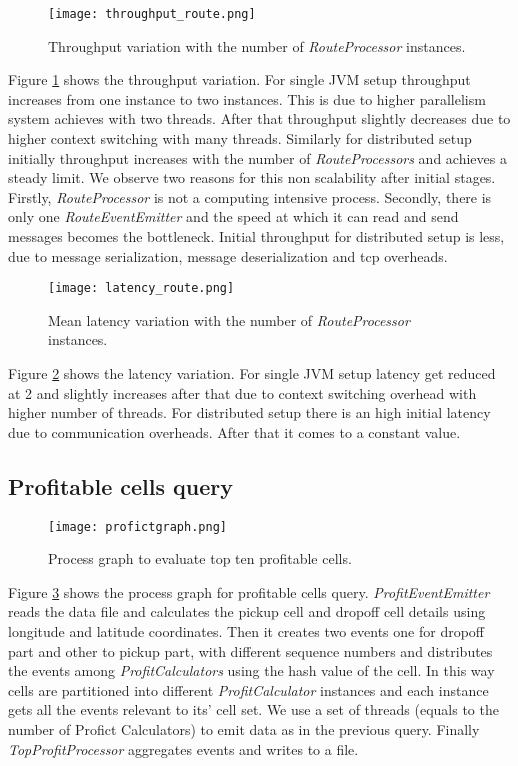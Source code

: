 \begin{figure}[!t]
        \centering
        \texttt{[image: throughput\_route.png]}
        \caption{Throughput variation with the number of \textit{RouteProcessor} instances.}
        \label{throughput_route}
\end{figure}

Figure \ref{throughput_route} shows the throughput variation. For single JVM setup throughput increases from one instance to two instances. This is due to higher parallelism system achieves with two threads. After that throughput slightly decreases due to higher context switching with many threads. Similarly for distributed setup initially throughput increases with the number of   \textit{RouteProcessors} and achieves a steady limit. We observe two reasons for this non scalability after initial stages. Firstly, \textit{RouteProcessor} is not a computing intensive process. Secondly, there is only one \textit{RouteEventEmitter} and the speed at which it can read and send messages becomes the bottleneck. Initial throughput for distributed setup is less, due to message serialization, message deserialization and tcp overheads. 

\begin{figure}[!t]
        \centering
        \texttt{[image: latency\_route.png]}
        \caption{Mean latency variation with the number of \textit{RouteProcessor} instances.}
        \label{latency_route}
\end{figure}

Figure \ref{latency_route} shows the latency variation. For single JVM setup latency get reduced at 2 and slightly increases after that due to context switching overhead with higher number of threads. For distributed setup there is an high initial latency due to communication overheads. After that it comes to a constant value. 

\subsection{Profitable cells query}

\begin{figure}[!t]
        \centering
        \texttt{[image: profictgraph.png]}
        \caption{Process graph to evaluate top ten profitable cells.}
        \label{profictgraph}
\end{figure}

Figure \ref{profictgraph} shows the process graph for profitable cells query. \textit{ProfitEventEmitter} reads the data file and calculates the pickup cell and dropoff cell details using longitude and latitude coordinates. Then it creates two events one for dropoff part and other to pickup part, with different sequence numbers and distributes the events among \textit{ProfitCalculators} using the hash value of the cell. In this way cells are partitioned into different \textit{ProfitCalculator} instances and each instance gets all the events relevant to its' cell set. We use a set of threads (equals to the number of Profict Calculators) to emit data as in the previous query. Finally \textit{TopProfitProcessor} aggregates events and writes to a file. 

